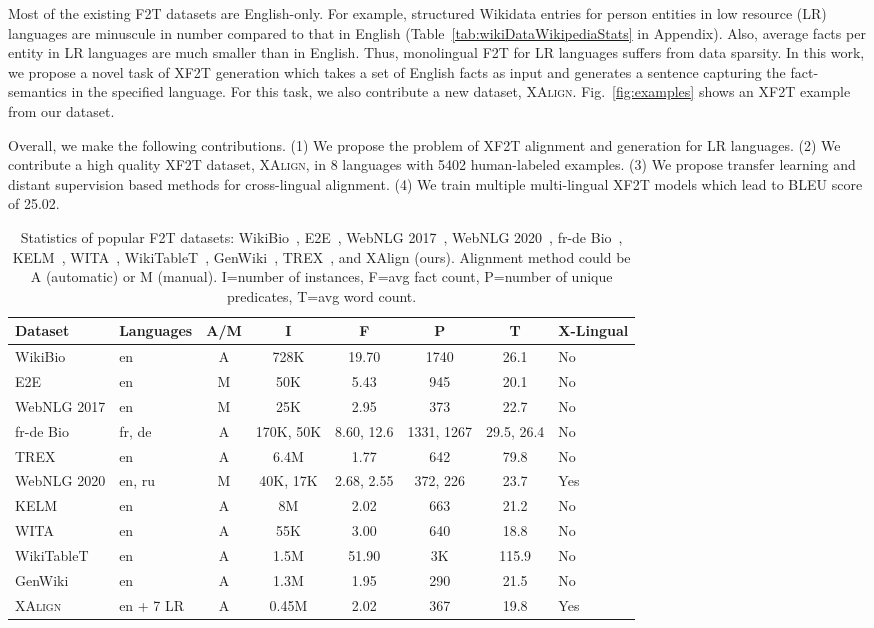 \documentclass[11pt]{article}
\def\langCount{8}
\def\lrLangCount{7}
\def\goldenCount{5402} \def\totalDataCount{0.45M}
\begin{document}
Most of the existing F2T datasets are English-only. For example, structured Wikidata entries for person entities in low resource (LR) languages are minuscule in number compared to that in English (Table~\ref{tab:wikiDataWikipediaStats} in Appendix). Also, average facts per entity in LR languages are much smaller than in English. Thus, monolingual F2T for LR languages suffers from data sparsity. In this work, we propose a novel task of XF2T generation which takes a set of English facts as input and generates a sentence capturing the fact-semantics in the specified language. For this task, we also contribute a new dataset, \textsc{XAlign}. Fig.~\ref{fig:examples} shows an XF2T example from our dataset. 








Overall, we make the following contributions. (1) We propose the problem of XF2T alignment and generation for LR languages. (2) We contribute a high quality XF2T dataset, \textsc{XAlign}, in \langCount{} languages with \goldenCount{} human-labeled examples. (3) We propose transfer learning and distant supervision based methods for cross-lingual alignment. (4) We train multiple multi-lingual XF2T models which lead to BLEU score of 25.02.

\begin{table*}[!t]
    \centering
    \scriptsize
    \begin{tabular}{|l|l|c|c|c|c|c|l|}
    \hline
Dataset&Languages&A/M&I&F&P&T&X-Lingual\\
\hline
\hline
WikiBio&en&A&728K&19.70&1740&26.1&No\\
\hline
E2E&en&M&50K&5.43&945&20.1&No\\
\hline
WebNLG 2017&en&M&25K&2.95&373&22.7&No\\
\hline
fr-de Bio&fr, de&A&170K, 50K&8.60, 12.6&1331, 1267&29.5, 26.4&No\\
\hline
TREX&en&A&6.4M&1.77&642&79.8&No\\
\hline
WebNLG 2020&en, ru&M&40K, 17K&2.68, 2.55&372, 226&23.7 &Yes\\
\hline
KELM&en&A&8M&2.02&663&21.2&No\\
\hline
WITA&en&A&55K&3.00&640&18.8&No\\
\hline
WikiTableT&en&A&1.5M&51.90&3K&115.9&No\\
\hline
GenWiki&en&A&1.3M&1.95&290&21.5&No\\
\hline
\hline
\textsc{XAlign}&en + \lrLangCount{} LR&A&0.45M&2.02&367&19.8&Yes\\
\hline
    \end{tabular}
    \caption{Statistics of popular F2T datasets: WikiBio~\cite{lebret2016wikibio}, E2E~\cite{novikova2017e2e}, WebNLG 2017~\cite{gardent2017webnlg}, WebNLG 2020~\cite{castro-ferreira-etal-2020-2020}, fr-de Bio~\cite{nema2018generating}, KELM~\cite{agarwal2021knowledge}, WITA~\cite{fu2020partially}, WikiTableT~\cite{chen2021wikitablet}, GenWiki~\cite{jin2020genwiki}, TREX~\cite{elsahar2018trex}, and XAlign (ours). Alignment method could be A (automatic) or M (manual). I=number of instances, F=avg fact count, P=number of unique predicates, T=avg word count.}
    \label{tab:dataStatsSurvey}
\end{table*}
\end{document}
